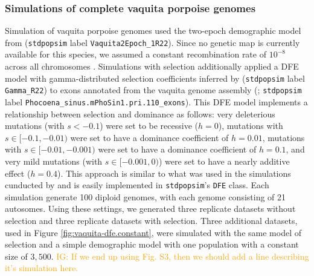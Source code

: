 \documentclass[hidelinks]{article}
\newcommand{\stdpopsim}{\texttt{stdpopsim}\xspace}
\newcommand{\igcomment}[1]{\textcolor{orange}{IG: #1}}
\begin{document}
    \subsubsection*{Simulations of complete vaquita porpoise genomes}
    Simulation of vaquita porpoise genomes used 
    the two-epoch demographic model from \cite{robinson2022critically} (\stdpopsim label \texttt{Vaquita2Epoch\_1R22}).
    Since no genetic map is currently available for this species, we assumed a constant recombination rate of  $10^{-8}$
    across all chromosomes \citep{morin2021}.
    Simulations with selection additionally applied a DFE model with gamma-distributed selection coefficients inferred by
    \cite{robinson2022critically} (\stdpopsim label \texttt{Gamma\_R22}) to exons annotated from the vaquita genome assembly
    (\cite{morin2021}; \stdpopsim label \texttt{Phocoena\_sinus.mPhoSin1.pri.110\_exons}).
    This DFE model implements a relationship between selection and dominance as follows:
    very deleterious mutations (with $s<-0.1$) were set to be recessive ($h=0$),
    mutations with $s\in [-0.1,-0.01)$ were set to have a dominance coefficient of $h=0.01$,
    mutations with $s\in [-0.01,-0.001)$ were set to have a dominance coefficient of $h=0.1$,
    and very mild mutations (with $s\in [-0.001,0)$) were set to have a nearly additive effect ($h=0.4$).
    This approach is similar to what was used in the simulations cunducted by \textcite{robinson2022critically}
    and is easily implemented in \stdpopsim's \texttt{DFE} class.
    Each simulation generate 100 diploid genomes,
    with each genome consisting of 21 autosomes.
    Using these settings, we generated three replicate datasets without selection
    and three replicate datasets with selection.
    Three additional datasets, used in Figure \ref{fig:vaquita-dfe.constant},
    were simulated with the same model of selection and a simple demographic model with one population with a constant size of $3,500$.
    \igcomment{If we end up using Fig. S3, then we should add a line describing it's simulation here.}
\end{document}
